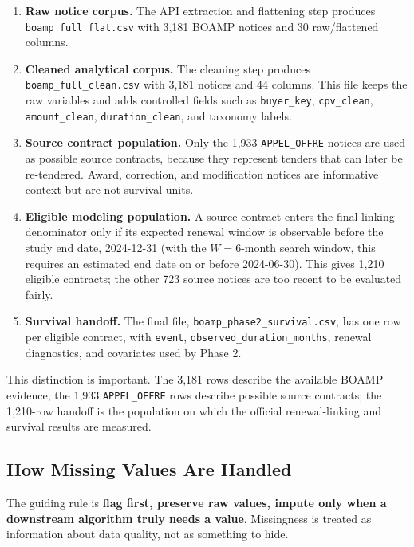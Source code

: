 \documentclass[12pt, a4paper]{article}
\begin{document}
\begin{enumerate}
  \item \textbf{Raw notice corpus.} The API extraction and flattening step
        produces \nolinkurl{boamp_full_flat.csv} with 3,181 BOAMP notices and 30
        raw/flattened columns.
  \item \textbf{Cleaned analytical corpus.} The cleaning step produces
        \texttt{boamp\_full\_clean.csv} with 3,181 notices and 44 columns. This
        file keeps the raw variables and adds controlled fields such as
        \texttt{buyer\_key}, \texttt{cpv\_clean}, \texttt{amount\_clean},
        \texttt{duration\_clean}, and taxonomy labels.
  \item \textbf{Source contract population.} Only the 1,933
        \texttt{APPEL\_OFFRE} notices are used as possible source contracts,
        because they represent tenders that can later be re-tendered. Award,
        correction, and modification notices are informative context but are not
        survival units.
  \item \textbf{Eligible modeling population.} A source contract enters the
        final linking denominator only if its expected renewal window is
        observable before the study end date, 2024-12-31 (with the $W=6$-month
        search window, this requires an estimated end date on or before
        2024-06-30). This gives 1,210 eligible contracts; the other 723 source
        notices are too recent to be evaluated fairly.
  \item \textbf{Survival handoff.} The final file,
        \nolinkurl{boamp_phase2_survival.csv}, has one row per eligible contract,
        with \texttt{event}, \texttt{observed\_duration\_months}, renewal
        diagnostics, and covariates used by Phase 2.
\end{enumerate}

This distinction is important. The 3,181 rows describe the available BOAMP
evidence; the 1,933 \texttt{APPEL\_OFFRE} rows describe possible source
contracts; the 1,210-row handoff is the population on which the official
renewal-linking and survival results are measured.

\subsection{How Missing Values Are Handled}

The guiding rule is \textbf{flag first, preserve raw values, impute only when a
downstream algorithm truly needs a value}. Missingness is treated as information
about data quality, not as something to hide.
\end{document}
